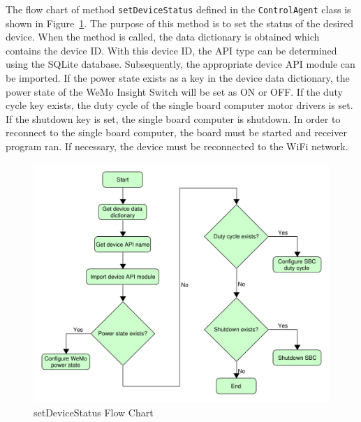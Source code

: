 \documentclass[conference]{IEEEtran}
\begin{document}
The flow chart of method \texttt{setDeviceStatus} defined in the \texttt{ControlAgent} class is shown in
Figure~\ref{fig:setDeviceStatus}. The purpose of this method is to set the
status of the desired device. When the method is called, the data dictionary is
obtained which contains the device ID. With this device ID, the API type can be
determined using the SQLite database. Subsequently, the appropriate device API
module can be imported. If the power state exists as a key in the device data
dictionary, the power state of the WeMo Insight Switch will be set as ON or OFF.
If the duty cycle key exists, the duty cycle of the single board computer motor
drivers is set. If the shutdown key is set, the single board computer is
shutdown. In order to reconnect to the single board computer, the board must be
started and receiver program ran. If necessary, the device must be reconnected
to the WiFi network. %

\begin{figure}[htbp]
    \centering
    \includegraphics[scale=0.2]{figs/agents/setDeviceStatus.pdf}
    \caption{setDeviceStatus Flow Chart}
    \label{fig:setDeviceStatus}
\end{figure}
\end{document}
